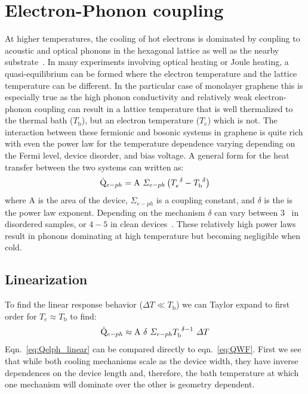 \section{Electron-Phonon coupling}
\label{section:elph}
At higher temperatures, the cooling of hot electrons is dominated by coupling to acoustic and optical phonons in the hexagonal lattice as well as the nearby substrate~\cite{viljas_electron-phonon_2010,bistritzer_electronic_2009}. In many experiments involving optical heating or Joule heating, a quasi-equilibrium can be formed where the electron temperature and the lattice temperature can be different. In the particular case of monolayer graphene this is especially true as the high phonon conductivity and relatively weak electron-phonon coupling can result in a lattice temperature that is well thermalized to the thermal bath ($T_\mathrm{b}$), but an electron temperature ($T_e$) which is not. The interaction between these fermionic and bosonic systems in graphene is quite rich with even the power law for the temperature dependence varying depending on the Fermi level, device disorder, and bias voltage. A general form for the heat transfer between the two systems can written as:
\begin{equation}\label{eq:Qelph}
\dot{\mathrm{Q}}_{e-ph}=\mathrm{A}~\Sigma_{e-ph}\left( T_e^{~\delta} - T_\mathrm{b}^{~\delta} \right)
\end{equation}
where $\mathrm{A}$ is the area of the device, $\Sigma_{e-ph}$ is a coupling constant, and $\delta$ is the is the power law exponent. Depending on the mechanism $\delta$ can vary between $3$~\cite{song_disorder-assisted_2012, chen_electron-phonon_2012} in disordered samples,  or $4-5$ in clean devices~\cite{viljas_electron-phonon_2010, bistritzer_electronic_2009}. These relatively high power laws result in phonons dominating at high temperature but becoming negligible when cold.
\subsection{Linearization}
To find the linear response behavior ($\Delta T \ll T_\mathrm{b}$) we can Taylor expand to first order for $T_e\approx T_\mathrm{b}$ to find:
\begin{equation}\label{eq:Qelph_linear}
\dot{\mathrm{Q}}_{e-ph} \approx \mathrm{A}~\delta~\Sigma_{e-ph}T_\mathrm{b}^{~\delta-1}~\Delta T
\end{equation}
Eqn.~\ref{eq:Qelph_linear} can be compared directly to eqn.~\ref{eq:QWF}. First we see that while both cooling mechanisms scale as the device width, they have inverse dependences on the device length and, therefore, the bath temperature at which one mechanism will dominate over the other is geometry dependent.


